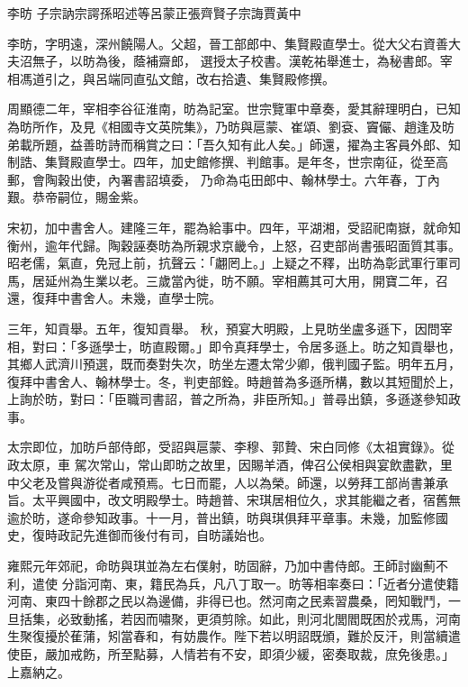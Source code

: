 
\begin{pinyinscope}

 李昉
 子宗訥宗諤孫昭述等呂蒙正張齊賢子宗誨賈黃中



 李昉，字明遠，深州饒陽人。父超，晉工部郎中、集賢殿直學士。從大父右資善大夫沼無子，以昉為後，蔭補齋郎，
 選授太子校書。漢乾祐舉進士，為秘書郎。宰相馮道引之，與呂端同直弘文館，改右拾遺、集賢殿修撰。



 周顯德二年，宰相李谷征淮南，昉為記室。世宗覽軍中章奏，愛其辭理明白，已知為昉所作，及見《相國寺文英院集》，乃昉與扈蒙、崔頌、劉袞、竇儼、趙逢及昉弟載所題，益善昉詩而稱賞之曰：「吾久知有此人矣。」師還，擢為主客員外郎、知制誥、集賢殿直學士。四年，加史館修撰、判館事。是年冬，世宗南征，從至高郵，會陶穀出使，內署書詔填委，
 乃命為屯田郎中、翰林學士。六年春，丁內艱。恭帝嗣位，賜金紫。



 宋初，加中書舍人。建隆三年，罷為給事中。四年，平湖湘，受詔祀南嶽，就命知衡州，逾年代歸。陶穀誣奏昉為所親求京畿令，上怒，召吏部尚書張昭面質其事。昭老儒，氣直，免冠上前，抗聲云：「翽罔上。」上疑之不釋，出昉為彰武軍行軍司馬，居延州為生業以老。三歲當內徙，昉不願。宰相薦其可大用，開寶二年，召還，復拜中書舍人。未幾，直學士院。



 三年，知貢舉。五年，復知貢舉。
 秋，預宴大明殿，上見昉坐盧多遜下，因問宰相，對曰：「多遜學士，昉直殿爾。」即令真拜學士，令居多遜上。昉之知貢舉也，其鄉人武濟川預選，既而奏對失次，昉坐左遷太常少卿，俄判國子監。明年五月，復拜中書舍人、翰林學士。冬，判吏部銓。時趙普為多遜所構，數以其短聞於上，上詢於昉，對曰：「臣職司書詔，普之所為，非臣所知。」普尋出鎮，多遜遂參知政事。



 太宗即位，加昉戶部侍郎，受詔與扈蒙、李穆、郭贄、宋白同修《太祖實錄》。從政太原，車
 駕次常山，常山即昉之故里，因賜羊酒，俾召公侯相與宴飲盡歡，里中父老及嘗與游從者咸預焉。七日而罷，人以為榮。師還，以勞拜工部尚書兼承旨。太平興國中，改文明殿學士。時趙普、宋琪居相位久，求其能繼之者，宿舊無逾於昉，遂命參知政事。十一月，普出鎮，昉與琪俱拜平章事。未幾，加監修國史，復時政記先進御而後付有司，自昉議始也。



 雍熙元年郊祀，命昉與琪並為左右僕射，昉固辭，乃加中書侍郎。王師討幽薊不利，遣使
 分詣河南、東，籍民為兵，凡八丁取一。昉等相率奏曰：「近者分遣使籍河南、東四十餘郡之民以為邊備，非得已也。然河南之民素習農桑，罔知戰鬥，一旦括集，必致動搖，若因而嘯聚，更須剪除。如此，則河北閭閻既困於戎馬，河南生聚復擾於萑蒲，矧當春和，有妨農作。陛下若以明詔既頒，難於反汗，則當續遣使臣，嚴加戒飭，所至點募，人情若有不安，即須少緩，密奏取裁，庶免後患。」上嘉納之。




\end{pinyinscope}
